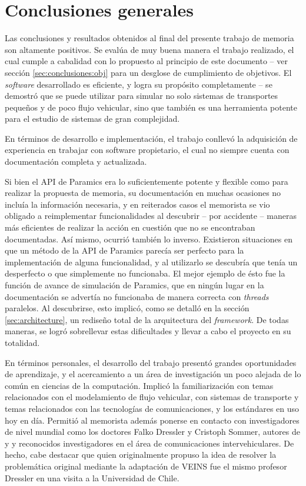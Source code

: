 \section{Conclusiones generales}

Las conclusiones y resultados obtenidos al final del presente trabajo de memoria son altamente positivos. Se evalúa de muy buena manera el trabajo realizado, el cual cumple a cabalidad con lo propuesto al principio de este documento -- ver sección \ref{sec:conclusiones:obj} para un desglose de cumplimiento de objetivos. El \emph{software} desarrollado es eficiente, y logra su propósito completamente -- se demostró que se puede utilizar para simular no solo sistemas de transportes pequeños y de poco flujo vehicular, sino que también es una herramienta potente para el estudio de sistemas de gran complejidad.

En términos de desarrollo e implementación, el trabajo conllevó la adquisición de experiencia en trabajar con software propietario, el cual no siempre cuenta con documentación completa y actualizada. 

Si bien el API de Paramics era lo suficientemente potente y flexible como para realizar la propuesta de memoria, su documentación en muchas ocasiones no incluía la información necesaria, y en reiterados casos el memorista se vio obligado a reimplementar funcionalidades al descubrir -- por accidente -- maneras más eficientes de realizar la acción en cuestión que no se encontraban documentadas. 
Así mismo, ocurrió también lo inverso. Existieron situaciones en que un método de la API de Paramics parecía ser perfecto para la implementación de alguna funcionalidad, y al utilizarlo se descubría que tenía un desperfecto o que simplemente no funcionaba. El mejor ejemplo de ésto fue la función de avance de simulación de Paramics, que en ningún lugar en la documentación se advertía no funcionaba de manera correcta con \emph{threads} paralelos. Al descubrirse, esto implicó, como se detalló en la sección \ref{sec:architecture}, un rediseño total de la arquitectura del \emph{framework}. De todas maneras, se logró sobrellevar estas dificultades y llevar a cabo el proyecto en su totalidad.

En términos personales, el desarrollo del trabajo presentó grandes oportunidades de aprendizaje, y el acercamiento a un área de investigación un poco alejada de lo común en ciencias de la computación. Implicó la familiarización con temas relacionados con el modelamiento de flujo vehicular, con sistemas de transporte y temas relacionados con las tecnologías de comunicaciones, y los estándares en uso hoy en día. Permitió al memorista además ponerse en contacto con investigadores de nivel mundial como los doctores Falko Dressler y Cristoph Sommer, autores de \autocite{sommer_german_dressler} y \autocite{sommer_dressler2} y reconocidos investigadores en el área de comunicaciones intervehiculares. De hecho, cabe destacar que quien originalmente propuso la idea de resolver la problemática original mediante la adaptación de VEINS fue el mismo profesor Dressler en una visita a la Universidad de Chile.

